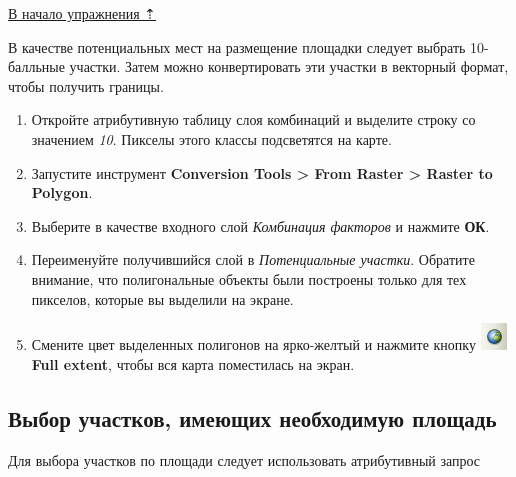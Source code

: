 \documentclass[]{book}
\theoremstyle{definition}
\theoremstyle{definition}
\theoremstyle{definition}
\theoremstyle{remark}
\begin{document}
\protect\hyperlink{weighted-overlay}{В начало упражнения ⇡}

В качестве потенциальных мест на размещение площадки следует выбрать
10-балльные участки. Затем можно конвертировать эти участки в векторный
формат, чтобы получить границы.

\begin{enumerate}
\def\labelenumi{\arabic{enumi}.}
\item
  Откройте атрибутивную таблицу слоя комбинаций и выделите строку со
  значением \emph{10}. Пикселы этого классы подсветятся на карте.
\item
  Запустите инструмент \textbf{Conversion Tools \textgreater{} From
  Raster \textgreater{} Raster to Polygon}.
\item
  Выберите в качестве входного слой \emph{Комбинация факторов} и нажмите
  \textbf{ОК}.
\item
  Переименуйте получившийся слой в \emph{Потенциальные участки}.
  Обратите внимание, что полигональные объекты были построены только для
  тех пикселов, которые вы выделили на экране.
\item
  Смените цвет выделенных полигонов на ярко-желтый и нажмите кнопку
  \includegraphics{images/Ex11/image5.png} \textbf{Full extent}, чтобы
  вся карта поместилась на экран.
\end{enumerate}

\hypertarget{weighted-overlay-area}{%
\subsection{Выбор участков, имеющих необходимую
площадь}\label{weighted-overlay-area}}

Для выбора участков по площади следует использовать атрибутивный запрос
\end{document}
